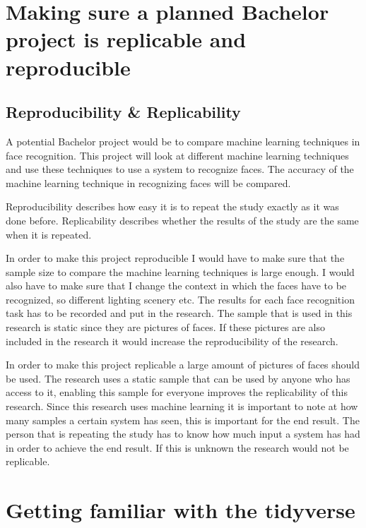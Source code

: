 \documentclass[11pt]{article}
\begin{document}
\section{Making sure a planned Bachelor project is replicable and reproducible}
\label{sec:orgc2efad9}
\subsection{Reproducibility \& Replicability}
\label{sec:org4222b8f}
A potential Bachelor project would be to compare machine learning
techniques in face recognition. This project will look at different
machine learning techniques and use these techniques to use a system
to recognize faces. The accuracy of the machine learning technique in
recognizing faces will be compared.



Reproducibility describes how easy it is to repeat the study exactly
as it was done before. Replicability describes whether the results of
the study are the same when it is repeated.


In order to make this project reproducible I would have to make sure
that the sample size to compare the machine learning techniques is
large enough. I would also have to make sure that I change the context
in which the faces have to be recognized, so different lighting
scenery etc. The results for each face recognition task has to be
recorded and put in the research. The sample that is used in this
research is static since they are pictures of faces. If these pictures
are also included in the research it would increase the
reproducibility of the research.


In order to make this project replicable a large amount of pictures of
faces should be used. The research uses a static sample that can be
used by anyone who has access to it, enabling this sample for everyone
improves the replicability of this research. Since this research uses
machine learning it is important to note at how many samples a certain
system has seen, this is important for the end result. The person that
is repeating the study has to know how much input a system has had in
order to achieve the end result. If this is unknown the research would
not be replicable.


\section{Getting familiar with the tidyverse}
\label{sec:orgef73762}
\end{document}
